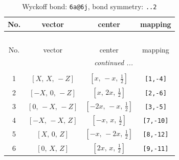 \documentclass[fleqn,8pt]{jsarticle}
\begin{document}
\begin{longtable}{cccc}
\caption{Wyckoff bond: {\tt 6a@6j}, bond symmetry: {\tt ..2}}
 \\
 \hline \hline
No. & vector & center & mapping \\ \hline \endfirsthead

\multicolumn{3}{l}{\tablename\ \thetable{}} \\
 \hline \hline
No. & vector & center & mapping \\ \hline \endhead

 \hline \hline
\multicolumn{3}{r}{\footnotesize\it continued ...} \\ \endfoot

 \hline \hline
\multicolumn{3}{r}{} \\ \endlastfoot

1 & $\left[ X,\, X,\, - Z \right]$ & $\left[ x,\, - x,\, \frac{1}{2} \right]$ & {\tt [1,-4]} \\ \hline
2 & $\left[ - X,\, 0,\, - Z \right]$ & $\left[ x,\, 2 x,\, \frac{1}{2} \right]$ & {\tt [2,-6]} \\ \hline
3 & $\left[ 0,\, - X,\, - Z \right]$ & $\left[ - 2 x,\, - x,\, \frac{1}{2} \right]$ & {\tt [3,-5]} \\ \hline
4 & $\left[ - X,\, - X,\, Z \right]$ & $\left[ - x,\, x,\, \frac{1}{2} \right]$ & {\tt [7,-10]} \\ \hline
5 & $\left[ X,\, 0,\, Z \right]$ & $\left[ - x,\, - 2 x,\, \frac{1}{2} \right]$ & {\tt [8,-12]} \\ \hline
6 & $\left[ 0,\, X,\, Z \right]$ & $\left[ 2 x,\, x,\, \frac{1}{2} \right]$ & {\tt [9,-11]} \\
\end{longtable}
\renewcommand{\arraystretch}{1.2}
\end{document}
